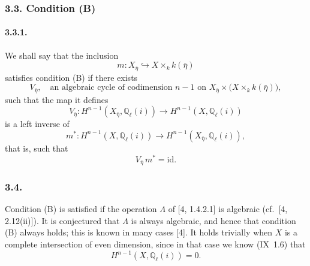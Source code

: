 \subsubsection*{3.3. Condition (B)}

\paragraph{3.3.1.}
We shall say that the inclusion
\begin{equation*}
m:X_{\bar\eta}\hookrightarrow X\times_k k(\bar\eta)
\end{equation*}
satisfies condition (B) if there exists
\begin{equation}\tag{3.3.2}
V_{\bar\eta},\quad
\text{an algebraic cycle of codimension $n-1$ on }
X_{\bar\eta}\times\bigl(X\times_k k(\bar\eta)\bigr),
\end{equation}
such that the map it defines
\begin{equation}\tag{3.3.3}
V_{\bar\eta}:H^{n-1}(X_{\bar\eta},\mathbb Q_\ell(i))
\longrightarrow H^{n-1}(X,\mathbb Q_\ell(i))
\end{equation}
is a left inverse of
\begin{equation}\tag{3.3.4}
m^*:H^{n-1}(X,\mathbb Q_\ell(i))
\longrightarrow H^{n-1}(X_{\bar\eta},\mathbb Q_\ell(i)),
\end{equation}
that is, such that
\begin{equation}\tag{3.3.5}
V_{\bar\eta}\,m^*=\mathrm{id}.
\end{equation}

\subsubsection*{3.4.}
Condition (B) is satisfied if the operation $\Lambda$ of [4, 1.4.2.1]
is algebraic (cf.~[4, 2.12(ii)]).  It is conjectured that $\Lambda$ is
always algebraic, and hence that condition (B) always holds; this is
known in many cases [4].  It holds trivially when $X$ is a complete
intersection of even dimension, since in that case we know (IX~1.6)
that
\begin{equation}\tag{3.4.1}
H^{n-1}(X,\mathbb Q_\ell(i))=0.
\end{equation}
